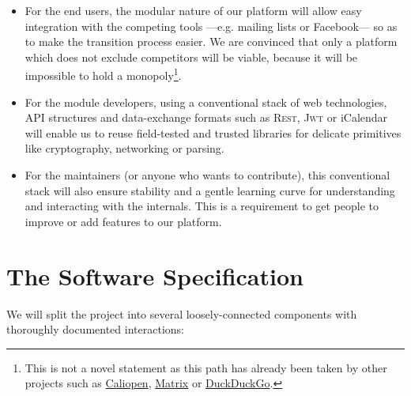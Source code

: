 \documentclass[a4paper, 12pt]{article}
\begin{document}
\begin{itemize}
\item For the end users, the modular nature of our platform will allow easy integration with the competing tools ---e.g. mailing lists or Facebook--- so as to make the transition process easier. We are convinced that only a platform which does not exclude competitors will be viable, because it will be impossible to hold a monopoly\footnote{This is not a novel statement as this path has already been taken by other projects such as \href{https://www.caliopen.org/en/}{Caliopen}, \href{https://matrix.org/docs/projects/try-matrix-now.html\#application-services}{Matrix} or \href{https://duckduckgo.com/bang}{DuckDuckGo}.}.
\item For the module developers, using a conventional stack of web technologies, API structures and data-exchange formats such as \textsc{Rest}, \textsc{Jwt} or iCalendar will enable us to reuse field-tested and trusted libraries for delicate primitives like cryptography, networking or parsing.
\item For the maintainers (or anyone who wants to contribute), this conventional stack will also ensure stability and a gentle learning curve for understanding and interacting with the internals. This is a requirement to get people to improve or add features to our platform.
\end{itemize}

\section{The Software Specification}

We will split the project into several loosely-connected components with thoroughly documented interactions:
\end{document}
